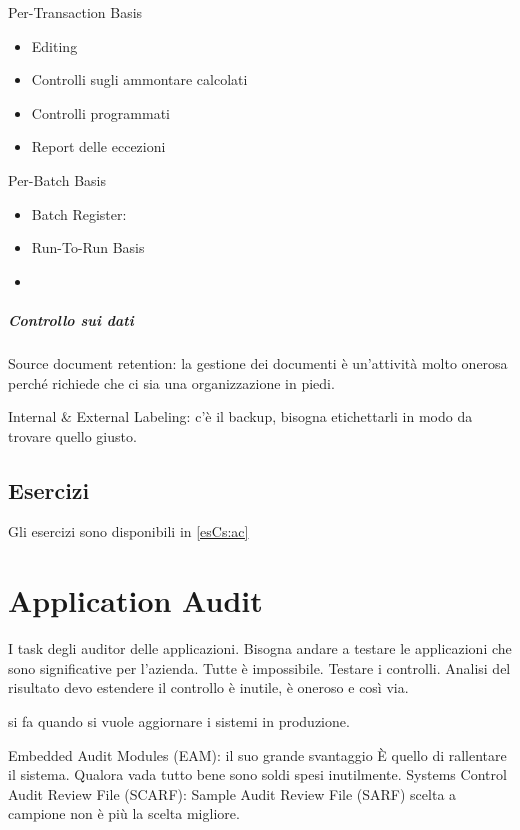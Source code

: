 Per-Transaction Basis 
\begin{itemize}
\item Editing
\item Controlli sugli ammontare calcolati
\item Controlli programmati
\item Report delle eccezioni
\end{itemize}

Per-Batch Basis

\begin{itemize}
\item Batch Register:
\item Run-To-Run Basis
\item
\end{itemize}

\paragraph{Controllo sui dati}


Source document retention: la gestione dei documenti è un'attività molto onerosa
perché richiede che ci sia una organizzazione in piedi.

Internal \& External Labeling: c'è il backup, bisogna etichettarli in modo da
trovare quello giusto.

\section{Esercizi}

Gli esercizi sono disponibili in \ref{esCs:ac}

\chapter{Application Audit}

I task degli auditor delle applicazioni. Bisogna andare a testare le
applicazioni che sono significative per l'azienda. Tutte è impossibile.
Testare i controlli. Analisi del risultato devo estendere il controllo è
inutile, è oneroso e così via.



si fa quando si vuole aggiornare i sistemi in produzione.

Embedded Audit Modules (EAM): il suo grande svantaggio È quello di rallentare il
sistema. Qualora vada tutto bene sono soldi spesi inutilmente.
Systems Control Audit Review File (SCARF):
Sample Audit Review File (SARF) scelta a campione non è più la scelta migliore.

